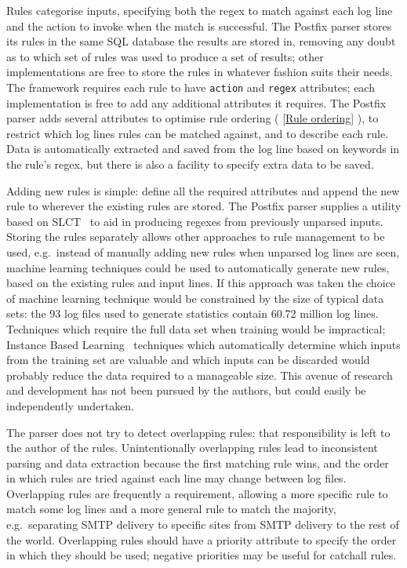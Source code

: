 \documentclass[draft]{svmult}
\newcommand{\sectionref}[1]{%
    \textsection{}\vref*{#1}%
}
\newcommand{\numberOFlogFILES}[0]{%
    93%
}
\newcommand{\numberOFlogLINEShuman}[0]{%
    60.72 million%
}
\begin{document}
\label{Rules}

Rules categorise inputs, specifying both the regex to match against each
log line and the action to invoke when the match is successful.  The
Postfix parser stores its rules in the same SQL database the results are
stored in, removing any doubt as to which set of rules was used to produce
a set of results; other implementations are free to store the rules in
whatever fashion suits their needs.  The framework requires each rule to
have \texttt{action} and \texttt{regex} attributes; each implementation is
free to add any additional attributes it requires.  The Postfix parser adds
several attributes to optimise rule ordering (\sectionref{Rule ordering}),
to restrict which log lines rules can be matched against, and to describe
each rule.  Data is automatically extracted and saved from the log line
based on keywords in the rule's regex, but there is also a facility to
specify extra data to be saved.

Adding new rules is simple: define all the required attributes and append
the new rule to wherever the existing rules are stored.  The Postfix parser
supplies a utility based on SLCT~\cite{slct-paper} to aid in producing
regexes from previously unparsed inputs.  Storing the rules separately
allows other approaches to rule management to be used, e.g.\ instead of
manually adding new rules when unparsed log lines are seen, machine
learning techniques could be used to automatically generate new rules,
based on the existing rules and input lines.  If this approach was taken
the choice of machine learning technique would be constrained by the size
of typical data sets: the \numberOFlogFILES{} log files used to generate
statistics contain \numberOFlogLINEShuman{} log lines.  Techniques which
require the full data set when training would be impractical; Instance
Based Learning~\cite{instance-based-learning} techniques which
automatically determine which inputs from the training set are valuable and
which inputs can be discarded would probably reduce the data required to a
manageable size.  This avenue of research and development has not been
pursued by the authors, but could easily be independently undertaken.

\label{overlapping rules}

The parser does not try to detect overlapping rules: that responsibility is
left to the author of the rules.  Unintentionally overlapping rules lead to
inconsistent parsing and data extraction because the first matching rule
wins, and the order in which rules are tried against each line may change
between log files.  Overlapping rules are frequently a requirement,
allowing a more specific rule to match some log lines and a more general
rule to match the majority, e.g.\ separating SMTP delivery to specific
sites from SMTP delivery to the rest of the world.  Overlapping rules
should have a priority attribute to specify the order in which they should
be used; negative priorities may be useful for catchall rules.
\end{document}
